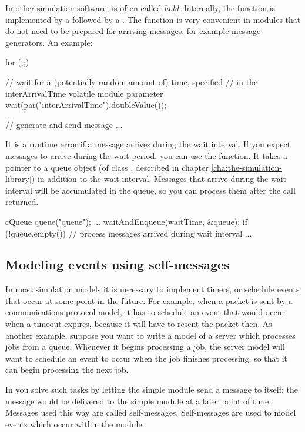 In other simulation software,  is often called \textit{hold}.
Internally, the  function is implemented by a
 followed by a .
The  function is very convenient in modules that do not need
to be prepared for arriving messages, for example message generators.
An example:

\begin{cpp}
for (;;)
{
  // wait for a (potentially random amount of) time, specified
  // in the interArrivalTime volatile module parameter
  wait(par("interArrivalTime").doubleValue());

  // generate and send message
  ...
}
\end{cpp}

It is a runtime error if a message arrives during the wait interval.
If you expect messages to arrive during the wait period, you can
use the  function. It takes a pointer to a queue object
(of class , described in chapter \ref{cha:the-simulation-library})
in addition to the wait interval. Messages that arrive during the
wait interval will be accumulated in the queue, so you can
process them after the  call returned.

\begin{cpp}
cQueue queue("queue");
...
waitAndEnqueue(waitTime, &queue);
if (!queue.empty())
{
  // process messages arrived during wait interval
  ...
}
\end{cpp}


\subsection{Modeling events using self-messages}
\label{sec:ch-simple-modules:self-messages}

In most simulation models it is necessary to implement timers,
or schedule events that occur at some point in the future.
For example, when a packet is sent by a communications protocol model,
it has to schedule an event that would occur when a timeout expires,
because it will have to resent the packet then.
As another example, suppose you want to write a model of a server which
processes jobs from a queue. Whenever it begins processing
a job, the server model will want to schedule an event to occur
when the job finishes processing, so that it can begin processing
the next job.

In {\opp} you solve such tasks by letting the simple module
send a message to itself; the message would be delivered
to the simple module at a later point of time. Messages used
this way are called self-messages.
Self-messages are used to model events which occur within the module.


